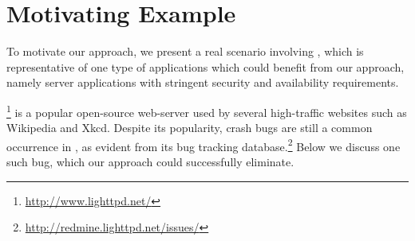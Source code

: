 \section{Motivating Example}
\label{sec:example}



To motivate our approach, we present a real scenario involving
\lighttpd, which is representative of one type of applications which
could benefit from our approach, namely server applications with
stringent security and availability requirements.


\lighttpd\footnote{\url{http://www.lighttpd.net/}} is a popular open-source 
web-server used 
by several high-traffic websites such as Wikipedia and Xkcd.
Despite its popularity, crash bugs are still a common
occurrence in \lighttpd, as evident from its bug tracking
database.\footnote{\url{http://redmine.lighttpd.net/issues/}}  Below
we discuss one such bug, which our approach could successfully
eliminate.


